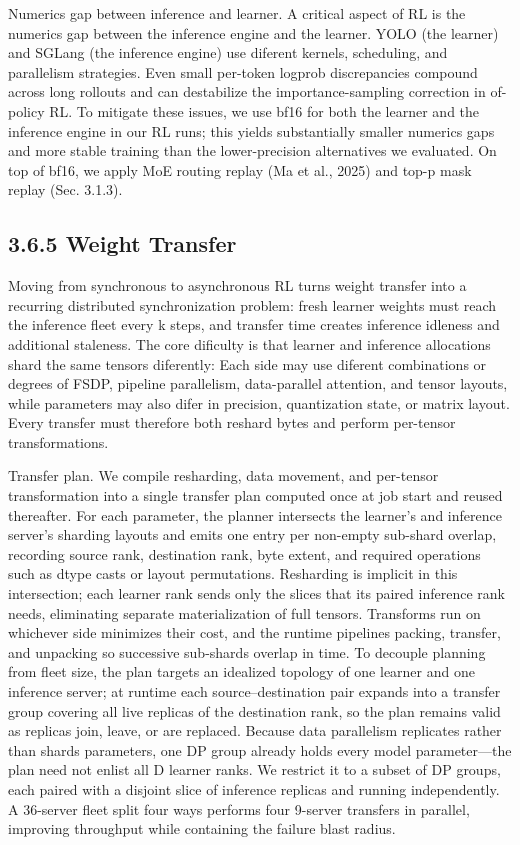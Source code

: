 \documentclass[
  10
]{article}
\begin{document}
Numerics gap between inference and learner. A critical aspect of RL is
the numerics gap between the inference engine and the learner. YOLO (the
learner) and SGLang (the inference engine) use diferent kernels,
scheduling, and parallelism strategies. Even small per-token logprob
discrepancies compound across long rollouts and can destabilize the
importance-sampling correction in of-policy RL. To mitigate these
issues, we use bf16 for both the learner and the inference engine in our
RL runs; this yields substantially smaller numerics gaps and more stable
training than the lower-precision alternatives we evaluated. On top of
bf16, we apply MoE routing replay (Ma et al., 2025) and top-p mask
replay (Sec. 3.1.3).

\subsection{3.6.5 Weight Transfer}\label{weight-transfer}

Moving from synchronous to asynchronous RL turns weight transfer into a
recurring distributed synchronization problem: fresh learner weights
must reach the inference fleet every k steps, and transfer time creates
inference idleness and additional staleness. The core dificulty is that
learner and inference allocations shard the same tensors diferently:
Each side may use diferent combinations or degrees of FSDP, pipeline
parallelism, data-parallel attention, and tensor layouts, while
parameters may also difer in precision, quantization state, or matrix
layout. Every transfer must therefore both reshard bytes and perform
per-tensor transformations.

Transfer plan. We compile resharding, data movement, and per-tensor
transformation into a single transfer plan computed once at job start
and reused thereafter. For each parameter, the planner intersects the
learner's and inference server's sharding layouts and emits one entry
per non-empty sub-shard overlap, recording source rank, destination
rank, byte extent, and required operations such as dtype casts or layout
permutations. Resharding is implicit in this intersection; each learner
rank sends only the slices that its paired inference rank needs,
eliminating separate materialization of full tensors. Transforms run on
whichever side minimizes their cost, and the runtime pipelines packing,
transfer, and unpacking so successive sub-shards overlap in time. To
decouple planning from fleet size, the plan targets an idealized
topology of one learner and one inference server; at runtime each
source--destination pair expands into a transfer group covering all live
replicas of the destination rank, so the plan remains valid as replicas
join, leave, or are replaced. Because data parallelism replicates rather
than shards parameters, one DP group already holds every model
parameter---the plan need not enlist all D learner ranks. We restrict it
to a subset of DP groups, each paired with a disjoint slice of inference
replicas and running independently. A 36-server fleet split four ways
performs four 9-server transfers in parallel, improving throughput while
containing the failure blast radius.
\end{document}
